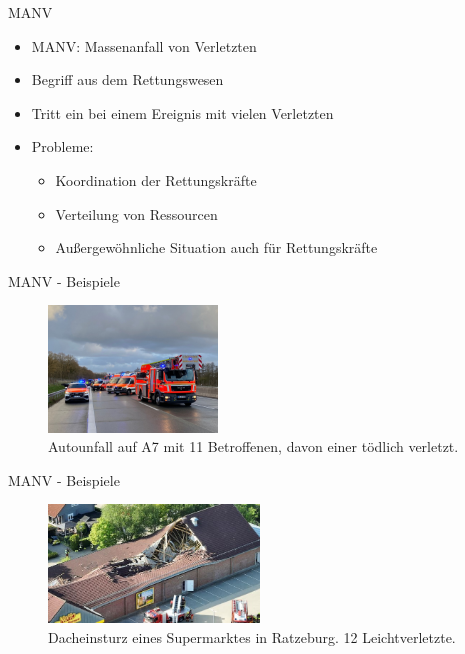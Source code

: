 \begin{frame}{MANV}
	\begin{itemize}
		\item MANV: \alert{Massenanfall von Verletzten}
		\item Begriff aus dem Rettungswesen
		\item Tritt ein bei einem Ereignis mit vielen Verletzten
		\item Probleme:
		      \begin{itemize}
			      \item Koordination der Rettungskräfte
			      \item Verteilung von Ressourcen
			      \item Außergewöhnliche Situation auch für Rettungskräfte
		      \end{itemize}
	\end{itemize}
\end{frame}

\begin{frame}{MANV - Beispiele}
	\begin{examples}
		\begin{figure}
			\begin{center}
				\includegraphics[width=0.4\textwidth]{images/autounfall.jpg}
			\end{center}
			\caption{Autounfall auf A7 mit 11 Betroffenen, davon einer tödlich verletzt.\cite{manv-a7}}\label{fig:autounfall}
		\end{figure}
	\end{examples}
\end{frame}

\begin{frame}{MANV - Beispiele}
	\begin{examples}
		\begin{figure}
			\begin{center}
				\includegraphics[width=0.5\textwidth]{images/ratzeburg-netto.jpg}
			\end{center}
			\caption{Dacheinsturz eines Supermarktes in Ratzeburg. 12 Leichtverletzte.\cite{manv-ratzeburg}}\label{fig:netto}
		\end{figure}
	\end{examples}
\end{frame}

